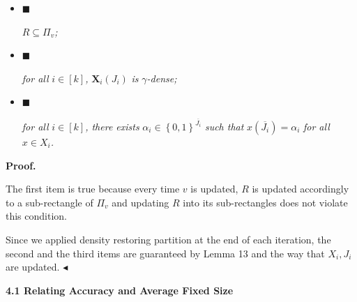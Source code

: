 \begin{itemize}


\item[] 
$\blacksquare$ 


$R\subseteq\Pi_{v}$\emph{;}\par





\item[] 
$\blacksquare$ 


\emph{for all }$i\in[k]$\emph{, }$\bm{X}_{i}(J_{i})$\emph{ is }$\gamma$\emph{-dense;}\par





\item[] 
$\blacksquare$ 


\emph{for all }$i\in[k]$\emph{, there exists }$\alpha_{i}\in\left\{0,1\right\}^{\overline{J_{i}}}$\emph{ such that }$x(\overline{J_{i}})=\alpha_{i}$\emph{ for all }$x\in X_{i}$\emph{.}\par





\end{itemize}






\par\medskip\noindent\textbf{Proof.}\par




The first item is true because every time $v$ is updated,
$R$ is updated accordingly to a sub-rectangle of $\Pi_{v}$ and updating $R$ into its sub-rectangles does not violate this condition.\par




Since we applied density restoring partition at the end of each iteration, the second and the third items are guaranteed by Lemma 13 and the way that $X_{i},J_{i}$ are updated.
$\blacktriangleleft$\par






\par\medskip\noindent\textbf{
4.1 Relating Accuracy and Average Fixed Size}\par




